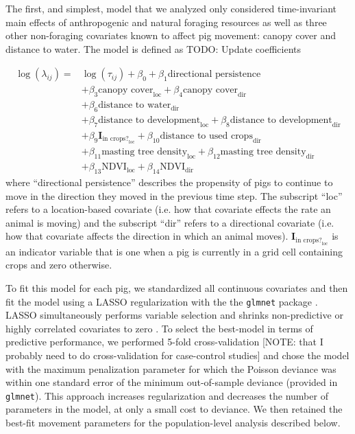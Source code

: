 \documentclass[a4paper]{article}
\begin{document}
The first, and simplest, model that we analyzed only considered time-invariant main effects of anthropogenic and natural foraging resources as well as three other non-foraging covariates known to affect pig movement: canopy cover and distance to water.  The model is defined as TODO: Update coefficients

\begin{align}
  \log(\lambda_{ij}) = & \log(\tau_{ij}) + \beta_0 +  \beta_1 \text{directional persistence}  \\
  & + \beta_{3} \text{canopy cover}_{\text{loc}} + \beta_{4} \text{canopy cover}_{\text{dir}} \\
  & + \beta_6 \text{distance to water}_{\text{dir}} \\
  & + \beta_7 \text{distance to development}_{\text{loc}} + \beta_8 \text{distance to development}_{\text{dir}} \\
  & + \beta_9\mathbf{I}_{\text{in crops?}_{\text{loc}}} + \beta_{10}\text{distance to used crops}_{\text{dir}} \\
  & + \beta_{11}\text{masting tree density}_{\text{loc}} + \beta_{12}\text{masting tree density}_{\text{dir}} \\
  & + \beta_{13}\text{NDVI}_{\text{loc}} + \beta_{14}\text{NDVI}_{\text{dir}}
\end{align}
where ``directional persistence'' describes the propensity of pigs to continue to move in the direction they moved in the previous time step.  The subscript ``loc'' refers to a location-based covariate (i.e. how that covariate effects the rate an animal is moving) and the subscript ``dir'' refers to a directional covariate (i.e. how that covariate affects the direction in which an animal moves). $\mathbf{I}_{\text{in crops?}_{\text{loc}}}$ is an indicator variable that is one when a pig is currently in a grid cell containing crops and zero otherwise.

To fit this model for each pig, we standardized all continuous covariates and then fit the model using a LASSO regularization with the the \texttt{glmnet} package \citep{Friedman2010}. LASSO simultaneously performs variable selection and shrinks non-predictive or highly correlated covariates to zero \cite{James2013}. To select the best-model in terms of predictive performance, we performed 5-fold cross-validation [NOTE: that I probably need to do cross-validation for case-control studies] and chose the model with the maximum penalization parameter for which the Poisson deviance was within one standard error of the minimum out-of-sample deviance (provided in \texttt{glmnet}). This approach increases regularization and decreases the number of parameters in the model, at only a small cost to deviance. We then retained the best-fit movement parameters for the population-level analysis described below.
\end{document}

